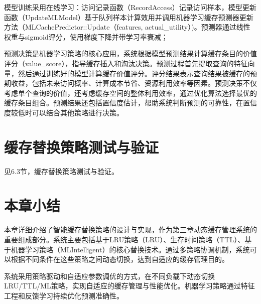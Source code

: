 模型训练采用在线学习：访问记录函数（RecordAccess）记录访问样本，模型更新函数（UpdateMLModel）基于队列样本计算效用并调用机器学习缓存预测器更新方法（MLCachePredictor::Update（features, actual\_utility）)。预测器通过线性权重与sigmoid评分，使用梯度下降并带学习率衰减；

预测决策是机器学习策略的核心应用，系统根据模型预测结果计算缓存条目的价值评分（value\_score），指导缓存插入和淘汰决策。预测过程首先提取查询的特征向量，然后通过训练好的模型计算缓存价值评分。评分结果表示查询结果被缓存的预期收益，包括未来访问概率、计算成本节省、资源利用效率等因素。预测决策不仅考虑单个查询的价值，还考虑缓存空间的整体利用效率，通过优化算法选择最优的缓存条目组合。预测结果还包括置信度估计，帮助系统判断预测的可靠性，在置信度较低时可以结合其他策略进行决策。
\section{缓存替换策略测试与验证}

见6.3节，缓存替换策略测试与验证。

\section{本章小结}

本章详细介绍了智能缓存替换策略的设计与实现，作为第三章动态缓存管理系统的重要组成部分。系统主要包括基于LRU策略（LRU）、生存时间策略（TTL）、基于机器学习策略（MLIntelligent）的核心替换技术。通过多策略协调机制，系统可以根据不同条件在这些策略之间动态切换，达到自适应的缓存管理目的。

系统采用策略驱动和自适应参数调优的方式，在不同负载下动态切换LRU/TTL/ML策略，实现自适应的缓存管理与性能优化。机器学习策略通过特征工程和反馈学习持续优化预测准确性。